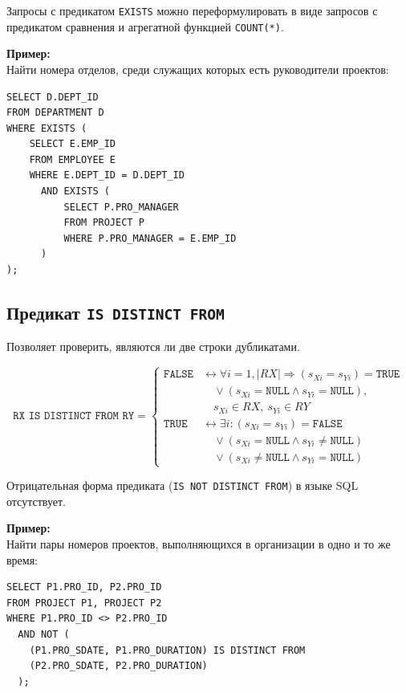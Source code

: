 \documentclass[a4paper,12pt]{article}
\begin{document}
Запросы с предикатом \texttt{EXISTS} можно переформулировать в виде запросов с предикатом сравнения и агрегатной функцией \texttt{COUNT(*)}.

\textbf{Пример:}\\
Найти номера отделов, среди служащих которых есть руководители проектов:
\begin{lstlisting}
SELECT D.DEPT_ID 
FROM DEPARTMENT D 
WHERE EXISTS (
    SELECT E.EMP_ID 
    FROM EMPLOYEE E 
    WHERE E.DEPT_ID = D.DEPT_ID 
      AND EXISTS (
          SELECT P.PRO_MANAGER 
          FROM PROJECT P 
          WHERE P.PRO_MANAGER = E.EMP_ID
      )
);
\end{lstlisting}

\subsection{Предикат \texttt{IS DISTINCT FROM}}

Позволяет проверить, являются ли две строки дубликатами.

\begin{flushleft}
\[
\texttt{RX IS DISTINCT FROM RY} = 
\begin{cases}
\texttt{FALSE} &\leftrightarrow \forall i=1, |RX| \Rightarrow (s_{Xi} = s_{Yi}) = \texttt{TRUE} \\
&\quad \lor (s_{Xi} = \texttt{NULL} \land s_{Yi} = \texttt{NULL}),\ \\
&\quad s_{Xi} \in RX,\ s_{Yi} \in RY \\[6pt]
\texttt{TRUE} &\leftrightarrow \exists i: (s_{Xi} = s_{Yi}) = \texttt{FALSE} \\
&\quad \lor (s_{Xi} = \texttt{NULL} \land s_{Yi} \neq \texttt{NULL}) \\
&\quad \lor (s_{Xi} \neq \texttt{NULL} \land s_{Yi} = \texttt{NULL})
\end{cases}
\]
\end{flushleft}

Отрицательная форма предиката (\texttt{IS NOT DISTINCT FROM}) в языке SQL отсутствует.

\textbf{Пример:}\\
Найти пары номеров проектов, выполняющихся в организации в одно и то же время:
\begin{lstlisting}
SELECT P1.PRO_ID, P2.PRO_ID 
FROM PROJECT P1, PROJECT P2 
WHERE P1.PRO_ID <> P2.PRO_ID 
  AND NOT (
    (P1.PRO_SDATE, P1.PRO_DURATION) IS DISTINCT FROM 
    (P2.PRO_SDATE, P2.PRO_DURATION)
  );
\end{lstlisting}
\end{document}

